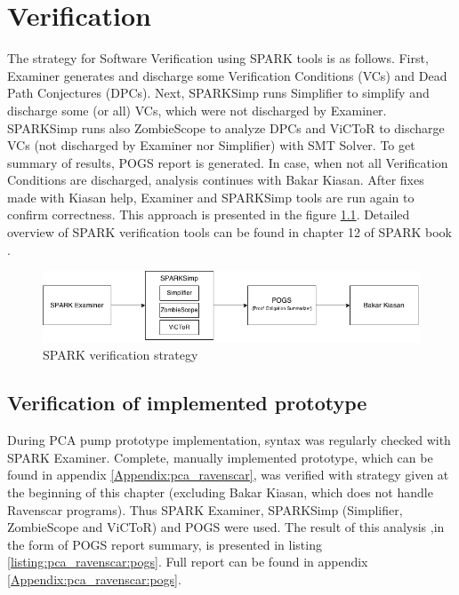 
\cleardoublepage

\chapter{Verification}
\label{verification}


The strategy for Software Verification using SPARK tools is as follows. First, Examiner generates and discharge some Verification Conditions (VCs) and Dead Path Conjectures (DPCs). Next, SPARKSimp runs Simplifier to simplify and discharge some (or all) VCs, which were not discharged by Examiner. SPARKSimp runs also ZombieScope to analyze DPCs and ViCToR to discharge VCs (not discharged by Examiner nor Simplifier) with SMT Solver. To get summary of results, POGS report is generated. In case, when not all Verification Conditions are discharged, analysis continues with Bakar Kiasan. After fixes made with Kiasan help, Examiner and SPARKSimp tools are run again to confirm correctness. This approach is presented in the figure \ref{figure:sparkverificationstrategy}. Detailed overview of SPARK verification tools can be found in chapter 12 of SPARK book \cite{Barnes:Book}.

\begin{figure}[ht]%
    \begin{center}
        \includegraphics[width=1.0\textwidth]{figures/spark-verification.png}
        \caption{SPARK verification strategy}
    \end{center}
    \label{figure:sparkverificationstrategy}
\end{figure}

\section{Verification of implemented prototype}
\label{verification:prototype}

During PCA pump prototype implementation, syntax was regularly checked with SPARK Examiner. Complete, manually implemented prototype, which can be found in appendix \ref{Appendix:pca_ravenscar}, was verified with strategy given at the beginning of this chapter (excluding Bakar Kiasan, which does not handle Ravenscar programs). Thus SPARK Examiner, SPARKSimp (Simplifier, ZombieScope and ViCToR) and POGS were used. The result of this analysis ,in the form of POGS report summary, is presented in listing \ref{listing:pca_ravenscar:pogs}. Full report can be found in appendix \ref{Appendix:pca_ravenscar:pogs}.

